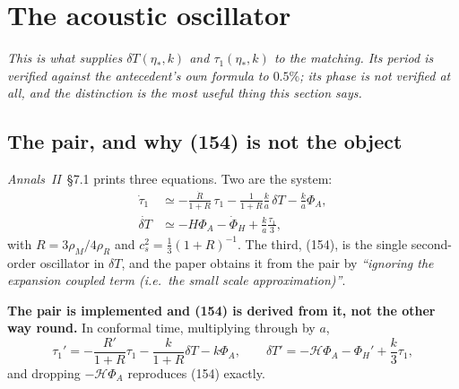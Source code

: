 %
%
\section{The acoustic oscillator}
\label{sec:oscillator}

\emph{This is what supplies $\delta T(\eta_*,k)$ and $\tau_1(\eta_*,k)$ to the
matching. Its period is verified against the antecedent's own formula to
$0.5\%$; its phase is not verified at all, and the distinction is the most
useful thing this section says.}

\subsection{The pair, and why (154) is not the object}

\emph{Annals~II}~\S7.1 prints three equations. Two are the system:
\begin{align}
  \dot\tau_1 &\simeq -\frac{\dot R}{1+R}\,\tau_1
               -\frac{1}{1+R}\frac ka\,\delta T-\frac ka\Phi_A,
               \tag{152}\label{eq:152}\\
  \dot{\delta T} &\simeq -H\Phi_A-\dot\Phi_H+\frac ka\frac{\tau_1}{3},
               \tag{153}\label{eq:153}
\end{align}
with $R=3\rho_M/4\rho_R$ and $c_s^2=\tfrac13(1+R)^{-1}$. The third, (154), is
the single second-order oscillator in $\delta T$, and the paper obtains it from
the pair by \emph{``ignoring the expansion coupled term (i.e.\ the small scale
approximation)''}.

\textbf{The pair is implemented and (154) is derived from it, not the other way
round.} In conformal time, multiplying through by $a$,
\begin{equation}
  \tau_1'=-\frac{R'}{1+R}\tau_1-\frac{k}{1+R}\delta T-k\Phi_A,
  \qquad
  \delta T'=-\mathcal H\Phi_A-\Phi_H'+\frac k3\tau_1 ,
  \label{eq:pair-conformal}
\end{equation}
and dropping $-\mathcal H\Phi_A$ reproduces (154) exactly.

